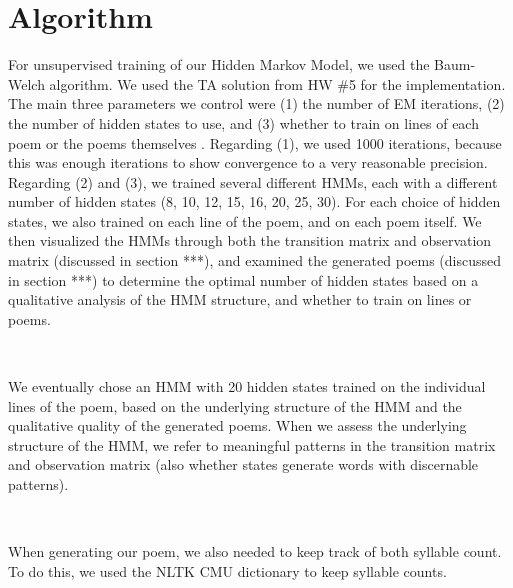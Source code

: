 \newif\ifshowsolutions
\showsolutionsfalse




\pagestyle{fancy}

\section*{Algorithm}

\medskip

For unsupervised training of our Hidden Markov Model, we used the Baum-Welch algorithm. We used the TA solution from HW \#5 for the implementation. The main three parameters we control were (1) the number of EM iterations, (2) the number of hidden states to use, and (3) whether to train on lines of each poem or the poems themselves  . Regarding (1), we used 1000 iterations, because this was enough iterations to show convergence to a very reasonable precision. Regarding (2) and (3), we trained several different HMMs, each with a different number of hidden states (8, 10, 12, 15, 16, 20, 25, 30). For each choice of hidden states, we also trained on each line of the poem, and on each poem itself. We then visualized the HMMs through both the transition matrix and observation matrix  (discussed in section ***), and examined the generated poems (discussed in section ***) to determine the optimal number of hidden states based on a qualitative analysis of the HMM structure, and whether to train on lines or poems.

~

We eventually chose an HMM with 20 hidden states trained on the individual lines of the poem, based on the underlying structure of the HMM and the qualitative quality of the generated poems. When we assess the underlying structure of the HMM, we refer to meaningful patterns in the transition matrix and observation matrix (also whether states generate words with discernable patterns).

~

When generating our poem, we also needed to keep track of both syllable count. To do this, we used the NLTK CMU dictionary to keep syllable counts.


\medskip

